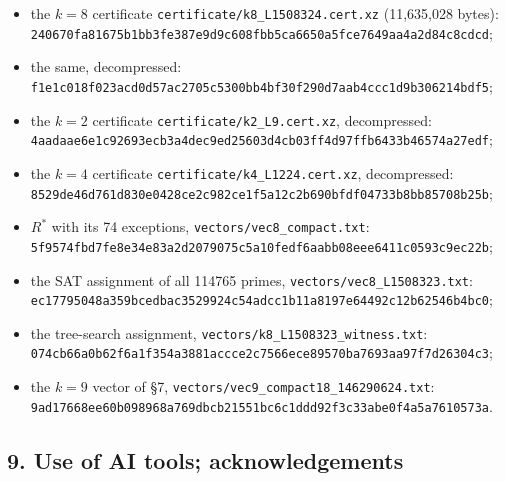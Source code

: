 \documentclass[
]{amsart}
\providecommand{\tightlist}{%
  \setlength{\itemsep}{0pt}\setlength{\parskip}{0pt}}
\begin{document}
\begin{itemize}
\tightlist
\item
  the \(k=8\) certificate \texttt{certificate/k8\_L1508324.cert.xz}
  (11,635,028 bytes):\\
  \texttt{240670fa81675b1bb3fe387e9d9c608fbb5ca6650a5fce7649aa4a2d84c8cdcd};
\item
  the same, decompressed:\\
  \texttt{f1e1c018f023acd0d57ac2705c5300bb4bf30f290d7aab4ccc1d9b306214bdf5};
\item
  the \(k=2\) certificate \texttt{certificate/k2\_L9.cert.xz},
  decompressed:\\
  \texttt{4aadaae6e1c92693ecb3a4dec9ed25603d4cb03ff4d97ffb6433b46574a27edf};
\item
  the \(k=4\) certificate \texttt{certificate/k4\_L1224.cert.xz},
  decompressed:\\
  \texttt{8529de46d761d830e0428ce2c982ce1f5a12c2b690bfdf04733b8bb85708b25b};
\item
  \(R^*\) with its 74 exceptions, \texttt{vectors/vec8\_compact.txt}:\\
  \texttt{5f9574fbd7fe8e34e83a2d2079075c5a10fedf6aabb08eee6411c0593c9ec22b};
\item
  the SAT assignment of all 114765 primes,
  \texttt{vectors/vec8\_L1508323.txt}:\\
  \texttt{ec17795048a359bcedbac3529924c54adcc1b11a8197e64492c12b62546b4bc0};
\item
  the tree-search assignment,
  \texttt{vectors/k8\_L1508323\_witness.txt}:\\
  \texttt{074cb66a0b62f6a1f354a3881accce2c7566ece89570ba7693aa97f7d26304c3};
\item
  the \(k=9\) vector of §7,
  \texttt{vectors/vec9\_compact18\_146290624.txt}:\\
  \texttt{9ad17668ee60b098968a769dbcb21551bc6c1ddd92f3c33abe0f4a5a7610573a}.
\end{itemize}

\hypertarget{use-of-ai-tools-acknowledgements}{%
\subsection{9. Use of AI tools;
acknowledgements}\label{use-of-ai-tools-acknowledgements}}
\end{document}
